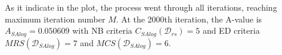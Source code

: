 \documentclass[
  a4paper,
  oneside,
  openany,
  12pt,
  onecolumn]{book}
\theoremstyle{plain}
\theoremstyle{definition}
\theoremstyle{remark}
\begin{document}
\begin{figure}


\caption{\label{fig-align}}

\end{figure}%

\begin{figure}


\caption{\label{fig-align}}

\end{figure}%

As it indicate in the plot, the process went through all iterations,
reaching maximum iteration number \(M\). At the 2000th iteration, the
A-value is \(A_{SAlog}=0.050609\) with NB criteria
\(C_{SAlog}(\mathcal{D}_{rs})=5\) and ED criteria
\(MRS(\mathcal{D}_{SAlog})=7\) and \(MCS(\mathcal{D}_{SAlog})=6\).
\end{document}
